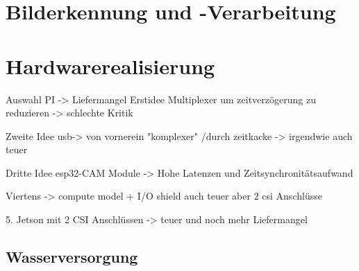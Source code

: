 

\section{Bilderkennung und -Verarbeitung}


\section{Hardwarerealisierung}

Auswahl PI -> Liefermangel
Erstidee Multiplexer um zeitverzögerung zu reduzieren -> schlechte Kritik

Zweite Idee usb-> von vornerein "komplexer" /durch zeitkacke -> irgendwie auch teuer

Dritte Idee esp32-CAM Module -> Hohe Latenzen und Zeitsynchronitätsaufwand

Viertens -> compute model + I/O shield auch teuer aber 2 csi Anschlüsse

5. Jetson mit 2 CSI Anschlüssen -> teuer und noch mehr Liefermangel

\subsection{Wasserversorgung}

